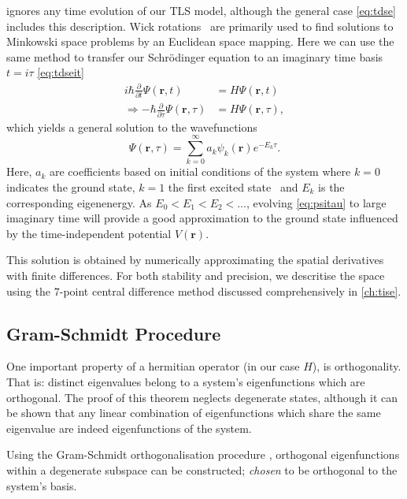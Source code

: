  ignores any time evolution of our TLS model, although the general case \cref{eq:tdse} includes this description.
Wick rotations~\cite{Wick1954} are primarily used to find solutions to Minkowski space problems by an Euclidean space mapping.
Here we can use the same method to transfer our Schr\"{o}dinger equation to an imaginary time basis $t=i\tau$ \cref{eq:tdseit}
\begin{align}
i \hbar \frac{\partial}{\partial t}\Psi(\mathbf{r},t) &= H\Psi(\mathbf{r},t)\label{eq:tdse}\\
\Rightarrow - \hbar \frac{\partial}{\partial \tau}\Psi(\mathbf{r},\tau) &= H\Psi(\mathbf{r},\tau),\label{eq:tdseit}
\end{align}
which yields a general solution to the wavefunctions
\begin{equation}
\Psi(\mathbf{r},\tau) = \sum_{k=0}^\infty a_k\psi_k(\mathbf{r})e^{-E_k \tau}.\label{eq:psitau}
\end{equation}
Here, ${a_k}$ are coefficients based on initial conditions of the system where $k=0$ indicates the ground state, $k=1$ the first excited state \etc\ and $E_k$ is the corresponding eigenenergy.
As $E_0 < E_1 < E_2 < \ldots$, evolving \cref{eq:psitau} to large imaginary time will provide a good approximation to the ground state influenced by the time-independent potential $V(\mathbf{r})$.

This solution is obtained by numerically approximating the spatial derivatives with finite differences.
For both stability and precision, we descritise the space using the $7$-point central difference method discussed comprehensively in \cref{ch:tise}.

\subsection{Gram-Schmidt Procedure}\label{sec:gsp}

One important property of a hermitian operator (in our case $H$), is orthogonality. That is: distinct eigenvalues belong to a system's eigenfunctions which are orthogonal.
The proof of this theorem neglects degenerate states, although it can be shown that any linear combination of eigenfunctions which share the same eigenvalue are indeed eigenfunctions of the system.

Using the Gram-Schmidt orthogonalisation procedure \cite{Gram1883, Schmidt1907}, orthogonal eigenfunctions within a degenerate subspace can be constructed; \textit{chosen} to be orthogonal to the system's basis.


